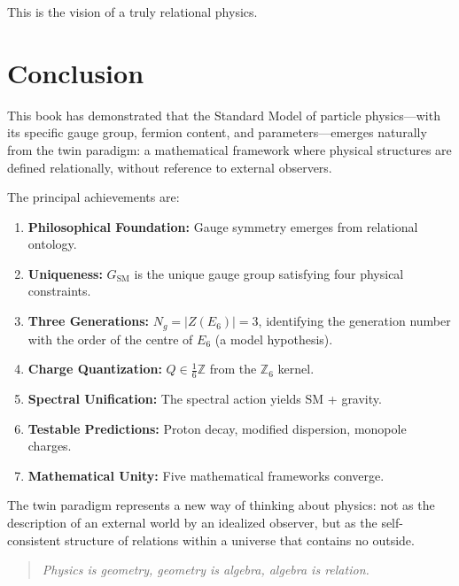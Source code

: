 \documentclass[11pt,a4paper,openright]{book}
\theoremstyle{plain}
\theoremstyle{definition}
\newcommand{\SM}{\mathrm{SM}}
\newcommand{\Z}{\mathbb{Z}}
\begin{document}
This is the vision of a truly relational physics.

\chapter*{Conclusion}

This book has demonstrated that the Standard Model of particle physics---with its specific gauge group, fermion content, and parameters---emerges naturally from the twin paradigm: a mathematical framework where physical structures are defined relationally, without reference to external observers.

The principal achievements are:

\begin{enumerate}
    \item \textbf{Philosophical Foundation:} Gauge symmetry emerges from relational ontology.
    
    \item \textbf{Uniqueness:} $G_{\SM}$ is the unique gauge group satisfying four physical constraints.
    
    \item \textbf{Three Generations:} $N_g = |Z(E_6)| = 3$, identifying the generation number with the order of the centre of $E_6$ (a model hypothesis).
    
    \item \textbf{Charge Quantization:} $Q \in \frac{1}{6}\Z$ from the $\Z_6$ kernel.
    
    \item \textbf{Spectral Unification:} The spectral action yields SM + gravity.
    
    \item \textbf{Testable Predictions:} Proton decay, modified dispersion, monopole charges.
    
    \item \textbf{Mathematical Unity:} Five mathematical frameworks converge.
\end{enumerate}

The twin paradigm represents a new way of thinking about physics: not as the description of an external world by an idealized observer, but as the self-consistent structure of relations within a universe that contains no outside.

\begin{quote}
\textit{Physics is geometry, geometry is algebra, algebra is relation.}
\end{quote}
\end{document}
